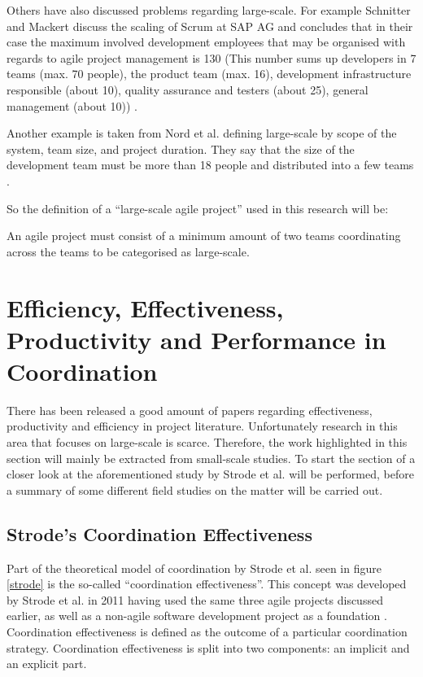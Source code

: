 Others have also discussed problems regarding large-scale. For example Schnitter and Mackert discuss the scaling of Scrum at SAP AG and concludes that in their case the maximum involved development employees that may be organised with regards to agile project management is 130 (This number sums up developers in 7 teams (max. 70 people), the product team (max. 16), development infrastructure responsible (about 10), quality assurance and testers (about 25), general management (about 10)) \cite{Nord2011}.

Another example is taken from Nord et al. defining large-scale by scope of the system, team size, and project duration. They say that the size of the development team must be more than 18 people and distributed into a few teams \cite{Robert2014}.

So the definition of a ``large-scale agile project'' used in this research will be:

\begin{fancyquotes}
An agile project must consist of a minimum amount of two teams coordinating across the teams to be categorised as large-scale.
\end{fancyquotes}

\section{Efficiency, Effectiveness, Productivity and Performance in Coordination}
\label{efficiency}

There has been released a good amount of papers regarding effectiveness, productivity and efficiency in project literature. Unfortunately research in this area that focuses on large-scale is scarce. Therefore, the work highlighted in this section will mainly be extracted from small-scale studies. To start the section of a closer look at the aforementioned study by Strode et al. will be performed, before a summary of some different field studies on the matter will be carried out.

\subsection{Strode's Coordination Effectiveness}
\label{cordinationeffectiveness}

Part of the theoretical model of coordination by Strode et al. seen in figure \ref{strode} is the so-called ``coordination effectiveness''. This concept was developed by Strode et al. in 2011 having used the same three agile projects discussed earlier, as well as a non-agile software development project as a foundation \cite{Strode2011}. Coordination effectiveness is defined as the outcome of a particular coordination strategy. Coordination effectiveness is split into two components: an implicit and an explicit part.

